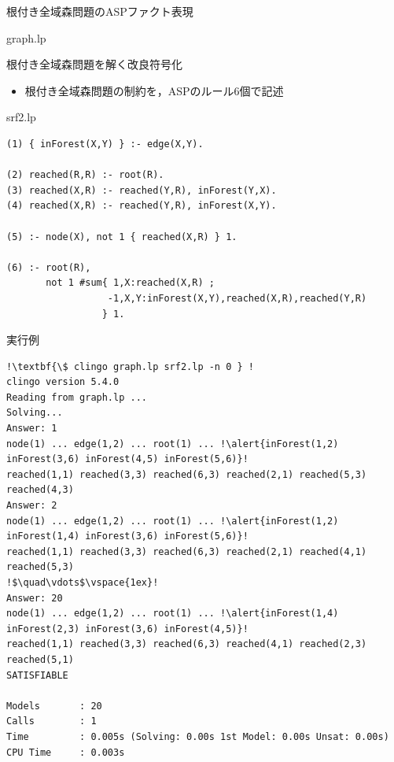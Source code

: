 \documentclass[dvipdfmx,11pt]{beamer}
\begin{document}
\begin{frame}{根付き全域森問題のASPファクト表現}
 \begin{figure}
  \centering
  
 \end{figure}\vfill
  \begin{exampleblock}{graph.lp}\centering\small
        
  \end{exampleblock}
\end{frame}
\begin{frame}[fragile]{根付き全域森問題を解く改良符号化}
\begin{itemize}
  \item 根付き全域森問題の制約を，ASPのルール6個で記述
\end{itemize}
\begin{minipage}[c]{1.01\textwidth}
\begin{exampleblock}{srf2.lp}\small
\begin{lstlisting}
(1) { inForest(X,Y) } :- edge(X,Y).

(2) reached(R,R) :- root(R).
(3) reached(X,R) :- reached(Y,R), inForest(Y,X).
(4) reached(X,R) :- reached(Y,R), inForest(X,Y).

(5) :- node(X), not 1 { reached(X,R) } 1.

(6) :- root(R),
       not 1 #sum{ 1,X:reached(X,R) ;
                  -1,X,Y:inForest(X,Y),reached(X,R),reached(Y,R) 
                 } 1.
\end{lstlisting}
\end{exampleblock}
\end{minipage}
\end{frame}
\begin{frame}[fragile]{実行例}
\tiny
\begin{lstlisting}[escapechar=!]
!\textbf{\$ clingo graph.lp srf2.lp -n 0 } !
clingo version 5.4.0
Reading from graph.lp ...
Solving...
Answer: 1
node(1) ... edge(1,2) ... root(1) ... !\alert{inForest(1,2) inForest(3,6) inForest(4,5) inForest(5,6)}!  
reached(1,1) reached(3,3) reached(6,3) reached(2,1) reached(5,3) reached(4,3)
Answer: 2
node(1) ... edge(1,2) ... root(1) ... !\alert{inForest(1,2) inForest(1,4) inForest(3,6) inForest(5,6)}!
reached(1,1) reached(3,3) reached(6,3) reached(2,1) reached(4,1) reached(5,3)
!$\quad\vdots$\vspace{1ex}!
Answer: 20
node(1) ... edge(1,2) ... root(1) ... !\alert{inForest(1,4) inForest(2,3) inForest(3,6) inForest(4,5)}!
reached(1,1) reached(3,3) reached(6,3) reached(4,1) reached(2,3) reached(5,1)
SATISFIABLE

Models       : 20
Calls        : 1
Time         : 0.005s (Solving: 0.00s 1st Model: 0.00s Unsat: 0.00s)
CPU Time     : 0.003s
\end{lstlisting}
\end{frame}
\end{document}
